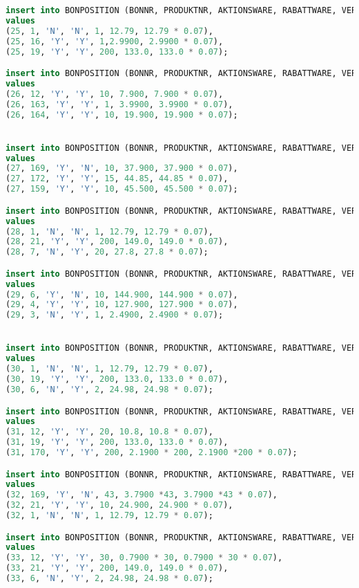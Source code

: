 \begin{lstlisting}[language=SQL]
insert into BONPOSITION (BONNR, PRODUKTNR, AKTIONSWARE, RABATTWARE, VERKAUFSMENGE, VERKAUFSPREIS, MWST)
values
(25, 1, 'N', 'N', 1, 12.79, 12.79 * 0.07),
(25, 16, 'Y', 'Y', 1,2.9900, 2.9900 * 0.07),
(25, 19, 'Y', 'Y', 200, 133.0, 133.0 * 0.07);

insert into BONPOSITION (BONNR, PRODUKTNR, AKTIONSWARE, RABATTWARE, VERKAUFSMENGE, VERKAUFSPREIS, MWST)
values
(26, 12, 'Y', 'Y', 10, 7.900, 7.900 * 0.07),
(26, 163, 'Y', 'Y', 1, 3.9900, 3.9900 * 0.07),
(26, 164, 'Y', 'Y', 10, 19.900, 19.900 * 0.07);


insert into BONPOSITION (BONNR, PRODUKTNR, AKTIONSWARE, RABATTWARE, VERKAUFSMENGE, VERKAUFSPREIS, MWST)
values
(27, 169, 'Y', 'N', 10, 37.900, 37.900 * 0.07),
(27, 172, 'Y', 'Y', 15, 44.85, 44.85 * 0.07),
(27, 159, 'Y', 'Y', 10, 45.500, 45.500 * 0.07);

insert into BONPOSITION (BONNR, PRODUKTNR, AKTIONSWARE, RABATTWARE, VERKAUFSMENGE, VERKAUFSPREIS, MWST)
values
(28, 1, 'N', 'N', 1, 12.79, 12.79 * 0.07),
(28, 21, 'Y', 'Y', 200, 149.0, 149.0 * 0.07),
(28, 7, 'N', 'Y', 20, 27.8, 27.8 * 0.07);

insert into BONPOSITION (BONNR, PRODUKTNR, AKTIONSWARE, RABATTWARE, VERKAUFSMENGE, VERKAUFSPREIS, MWST)
values
(29, 6, 'Y', 'N', 10, 144.900, 144.900 * 0.07),
(29, 4, 'Y', 'Y', 10, 127.900, 127.900 * 0.07),
(29, 3, 'N', 'Y', 1, 2.4900, 2.4900 * 0.07);


insert into BONPOSITION (BONNR, PRODUKTNR, AKTIONSWARE, RABATTWARE, VERKAUFSMENGE, VERKAUFSPREIS, MWST)
values
(30, 1, 'N', 'N', 1, 12.79, 12.79 * 0.07),
(30, 19, 'Y', 'Y', 200, 133.0, 133.0 * 0.07),
(30, 6, 'N', 'Y', 2, 24.98, 24.98 * 0.07);

insert into BONPOSITION (BONNR, PRODUKTNR, AKTIONSWARE, RABATTWARE, VERKAUFSMENGE, VERKAUFSPREIS, MWST)
values
(31, 12, 'Y', 'Y', 20, 10.8, 10.8 * 0.07),
(31, 19, 'Y', 'Y', 200, 133.0, 133.0 * 0.07),
(31, 170, 'Y', 'Y', 200, 2.1900 * 200, 2.1900 *200 * 0.07);

insert into BONPOSITION (BONNR, PRODUKTNR, AKTIONSWARE, RABATTWARE, VERKAUFSMENGE, VERKAUFSPREIS, MWST)
values
(32, 169, 'Y', 'N', 43, 3.7900 *43, 3.7900 *43 * 0.07),
(32, 21, 'Y', 'Y', 10, 24.900, 24.900 * 0.07),
(32, 1, 'N', 'N', 1, 12.79, 12.79 * 0.07);

insert into BONPOSITION (BONNR, PRODUKTNR, AKTIONSWARE, RABATTWARE, VERKAUFSMENGE, VERKAUFSPREIS, MWST)
values
(33, 12, 'Y', 'Y', 30, 0.7900 * 30, 0.7900 * 30 * 0.07),
(33, 21, 'Y', 'Y', 200, 149.0, 149.0 * 0.07),
(33, 6, 'N', 'Y', 2, 24.98, 24.98 * 0.07);



\end{lstlisting}
